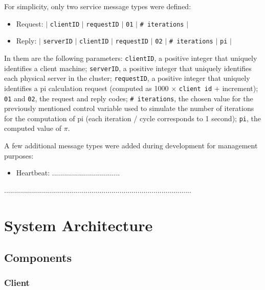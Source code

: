 \documentclass[12pt]{article}
\begin{document}
For simplicity, only two service message types were defined:
\vspace{-10pt}
\begin{itemize}[noitemsep]
  \item Request: $|$ \texttt{clientID} $|$ \texttt{requestID} $|$ \texttt{01} $|$ \texttt{\# iterations} $|$
  \item Reply: $|$ \texttt{serverID} $|$ \texttt{clientID} $|$ \texttt{requestID} $|$ \texttt{02} $|$ \texttt{\# iterations} $|$ \texttt{pi} $|$
\end{itemize}
\vspace{-10pt}
In them are the following parameters:
\texttt{clientID}, a positive integer that uniquely identifies a client machine;
\texttt{serverID}, a positive integer that uniquely identifies each physical server in the cluster;
\texttt{requestID}, a positive integer that uniquely identifies a pi calculation request (computed as 1000 $\times$ \texttt{client id} $+$ increment);
\texttt{01} and \texttt{02}, the request and reply codes;
\texttt{\# iterations}, the chosen value for the previously mentioned control variable used to simulate the number of iterations for the computation of pi
(each iteration / cycle corresponds to 1 second);
\texttt{pi}, the computed value of $\pi$.

A few additional message types were added during development for management purposes:
\vspace{-10pt}
\begin{itemize}[noitemsep]
  \item Heartbeat: ..................................
\end{itemize}
\vspace{-10pt}

..............................................................................................

\newpage
\section{System Architecture} \label{architecture} %


\subsection{Components} \label{components} %

\subsubsection{Client}
\end{document}
